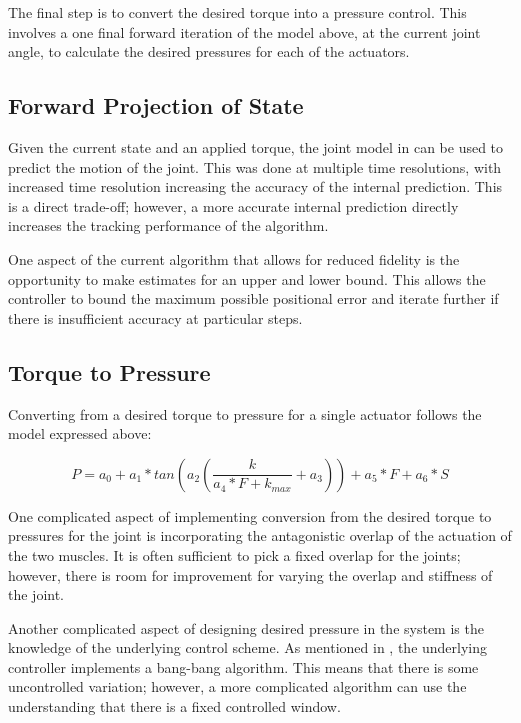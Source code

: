 The final
step is to convert the desired torque into a pressure control. This involves a 
one final forward iteration of the model above, at the current joint angle, to 
calculate the desired pressures for each of the actuators.

\subsection{Forward Projection of State}

Given the current state and an applied torque, the joint model in 
 can be used to predict the motion of the joint.
This was done at multiple time resolutions, with increased time resolution 
increasing the accuracy of the internal prediction. This is a direct trade-off;
however, a more accurate internal prediction directly increases the tracking
performance of the algorithm.

One aspect of the current algorithm that allows for reduced fidelity is the 
opportunity to make estimates for an upper and lower bound. This allows the 
controller to bound the maximum possible positional error and iterate further
if there is insufficient accuracy at particular steps.

\subsection{Torque to Pressure}

Converting from a desired torque to pressure for a single actuator follows
the model expressed above:

\begin{equation}
P = a_{0} + a_{1} * tan(a_{2} (\dfrac{k}{a_{4} * F + k_{max}} + a_{3})) + a_{5} * F + a_{6} * S
\end{equation}

One complicated aspect of implementing conversion from the desired torque to 
pressures for
the joint is incorporating the antagonistic overlap of the actuation of the two 
muscles. It is often sufficient to pick a fixed overlap for the joints; however,
there is room for improvement for varying the overlap and stiffness of the joint.

Another complicated aspect of designing desired pressure in the system is the
knowledge of the underlying control scheme. As mentioned in \cite{HuntPMuscles},
the underlying controller implements a bang-bang algorithm. This means that 
there is some uncontrolled variation; however, a more complicated algorithm
can use the understanding that there is a fixed controlled window.


